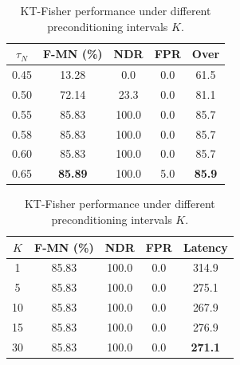 \documentclass{article}
\theoremstyle{plain}
\theoremstyle{definition}
\theoremstyle{remark}
\begin{document}
\begin{table}[t]
\begin{minipage}{0.32\textwidth}
\caption{KT-Fisher performance under different novelty thresholds \(\tau_N\).}
\label{tab:ablation_thresh}
\vskip 0.15in
\begin{center}
\begin{small}
\begin{sc}
\begin{tabular}{ccccc}
\toprule
\(\tau_N\) & F-MN (\%) & NDR & FPR & Over \\
\midrule
0.45 & 13.28 & 0.0 & 0.0 & 61.5 \\
0.50 & 72.14 & 23.3 & 0.0 & 81.1 \\
0.55 & 85.83 & 100.0 & 0.0 & 85.7 \\
0.58 & 85.83 & 100.0 & 0.0 & 85.7 \\
0.60 & 85.83 & 100.0 & 0.0 & 85.7 \\
0.65 & \textbf{85.89} & 100.0 & 5.0 & \textbf{85.9} \\
\bottomrule
\end{tabular}
\end{sc}
\end{small}
\end{center}
\end{minipage}
\hfill
\begin{minipage}{0.32\textwidth}
\caption{KT-Fisher performance under different preconditioning intervals \(K\).}
\label{tab:ablation_periodic}
\vskip 0.15in
\begin{center}
\begin{small}
\begin{sc}
\begin{tabular}{ccccc}
\toprule
\(K\) & F-MN (\%) & NDR & FPR & Latency \\
\midrule
1  & 85.83 & 100.0 & 0.0 & 314.9 \\
5  & 85.83 & 100.0 & 0.0 & 275.1 \\
10 & 85.83 & 100.0 & 0.0 & 267.9 \\
15 & 85.83 & 100.0 & 0.0 & 276.9 \\
30 & 85.83 & 100.0 & 0.0 & \textbf{271.1} \\
\bottomrule
\end{tabular}
\end{sc}
\end{small}
\end{center}
\end{minipage}
\hfill
\begin{minipage}{0.32\textwidth}

\end{minipage}
\end{table}
\end{document}
